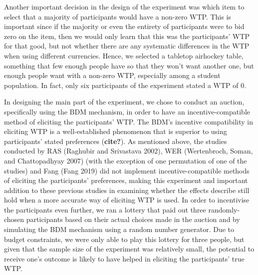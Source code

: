 \documentclass[
]{report}
\begin{document}
Another important decision in the design of the experiment was which
item to select that a majority of participants would have a non-zero
WTP. This is important since if the majority or even the entirety of
participants were to bid zero on the item, then we would only learn that
this was the participants' WTP for that good, but not whether there are
any systematic differences in the WTP when using different currencies.
Hence, we selected a tabletop airhockey table, something that few enough
people have so that they won't want another one, but enough people want
with a non-zero WTP, especially among a student population. In fact,
only six participants of the experiment stated a WTP of 0.

In designing the main part of the experiment, we chose to conduct an
auction, specifically using the BDM mechanism, in order to have an
incentive-compatible method of eliciting the participants' WTP. The
BDM's incentive compatibility in eliciting WTP is a well-established
phenomenon that is superior to using participants' stated preferences
(\textbf{cite?}). As mentioned above, the studies conducted by RAS
(Raghubir and Srivastava 2002), WER (Wertenbroch, Soman, and
Chattopadhyay 2007) (with the exception of one permutation of one of the
studies) and Fang (Fang 2019) did not implement incentive-compatible
methods of eliciting the participants' preferences, making this
experiment and important addition to these previous studies in examining
whether the effects describe still hold when a more accurate way of
eliciting WTP is used. In order to incentivise the participants even
further, we ran a lottery that paid out three randomly-chosen
participants based on their actual choices made in the auction and by
simulating the BDM mechanism using a random number generator. Due to
budget constraints, we were only able to play this lottery for three
people, but given that the sample size of the experiment was relatively
small, the potential to receive one's outcome is likely to have helped
in eliciting the participants' true WTP.
\end{document}
